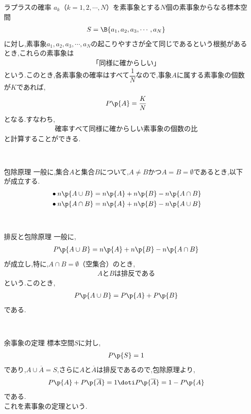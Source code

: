 \documentclass[10pt,fleqn,a4paper]{jsarticle}
\begin{document}
\begin{itembox}
    [l]{\enpitu ラプラスの確率}
    $a_k（k=1,2,\cdots,N）$を素事象とする$N$個の素事象からなる標本空間
    \begin{align*}
        S=\B{a_1,a_2,a_3,\cdots,a_N}
    \end{align*}
    に対し,素事象$a_1,a_2,a_3,\cdots,a_N$の起こりやすさが全て同じであるという根拠があるとき,これらの素事象は
    \begin{align*}
    「同様に確からしい」
    \end{align*}
    という.このとき,各素事象の確率はすべて$\dfrac{1}{N}$なので,事象$A$に属する素事象の個数が$K$であれば,
    \begin{align*}
        P\p{A}=\dfrac{K}{N}
    \end{align*}
    となる.すなわち,
    \begin{align*}
        確率すべて同様に確からしい素事象の個数の比
    \end{align*}
    と計算することができる.
\end{itembox}\\
\begin{itembox}
    [l]{\enpitu 包除原理}
    一般に,集合$A$と集合$B$について,$A\neq B$かつ$A=B=\emptyset$であるとき,以下が成立する.
    \begin{align*}
        &\bullet n\p{A\cup B}=n\p{A}+n\p{B}-n\p{A\cap B}\\
        &\bullet n\p{A\cap B}=n\p{A}+n\p{B}-n\p{A\cup B}
    \end{align*}
\end{itembox}\\
\begin{itembox}
    [l]{\enpitu 排反と包除原理}
    一般に,
    \begin{align*}
        P\p{A\cup B}=n\p{A}+n\p{B}-n\p{A\cap B}
    \end{align*}
    が成立し,特に,$A\cap B=\emptyset（空集合）$のとき,
    \begin{align*}
        AとBは排反である
    \end{align*}
    という.このとき,
    \begin{align*}
        P\p{A\cup B}=P\p{A}+P\p{B}
    \end{align*}
    である.
\end{itembox}\\
\begin{itembox}
    [l]{\enpitu 余事象の定理}
    標本空間$S$に対し,
    \begin{align*}
        P\p{S}=1
    \end{align*}
    であり,$A\cup \overline{A}=S$,さらに$Aと\overline{A}$は排反であるので,包除原理より,
    \begin{align*}
        P\p{A}+P\p{\overline{A}}=1\doti P\p{\overline{A}}=1-P\p{A}
    \end{align*}
    である.\\
    これを素事象の定理という.
\end{itembox}
\end{document}
